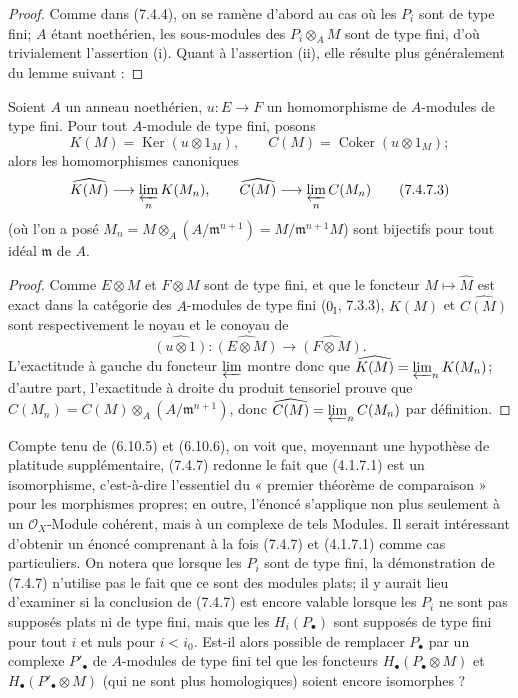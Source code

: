 \begin{proof}
Comme dans (7.4.4), on se ramène d'abord au cas où les $P_i$ sont de type fini;
$A$ étant noethérien, les sous-modules des $P_i\otimes_A M$ sont de type fini,
d'où trivialement l'assertion (i). Quant à l'assertion (ii), elle résulte plus
généralement du lemme suivant :
\end{proof}

\begin{lemma}[7.4.7.2]
Soient $A$ un anneau noethérien, $u:E\to F$ un homomorphisme de $A$-modules de
type fini. Pour tout $A$-module de type fini, posons
\[
  K(M)=\operatorname{Ker}(u\otimes1_M),
  \qquad
  C(M)=\operatorname{Coker}(u\otimes1_M);
\]
alors les homomorphismes canoniques
\[
  \widehat{K(M)}\longrightarrow\varprojlim_n K(M_n),
  \qquad
  \widehat{C(M)}\longrightarrow\varprojlim_n C(M_n)
  \tag{7.4.7.3}\label{III.7.4.7.3.fr}
\]
(où l'on a posé
$M_n=M\otimes_A(A/\mathfrak m^{n+1})=M/\mathfrak m^{n+1}M$) sont bijectifs
pour tout idéal $\mathfrak m$ de $A$.
\end{lemma}

\begin{proof}
Comme $E\otimes M$ et $F\otimes M$ sont de type fini, et que le foncteur
$M\mapsto\widehat M$ est exact dans la catégorie des $A$-modules de type fini
($0_{\mathrm I}$, 7.3.3), $\widehat{K(M)}$ et $\widehat{C(M)}$ sont
respectivement le noyau et le conoyau de
\[
  \widehat{(u\otimes1)}:
  \widehat{(E\otimes M)}\longrightarrow\widehat{(F\otimes M)}.
\]
L'exactitude à gauche du foncteur $\varprojlim$ montre donc que
$\widehat{K(M)}=\varprojlim_n K(M_n)$; d'autre part, l'exactitude à droite du
produit tensoriel prouve que
$C(M_n)=C(M)\otimes_A(A/\mathfrak m^{n+1})$, donc
$\widehat{C(M)}=\varprojlim_n C(M_n)$ par définition.
\end{proof}

\begin{remark}[7.4.8]
Compte tenu de (6.10.5) et (6.10.6), on voit que, moyennant une hypothèse de
platitude supplémentaire, (7.4.7) redonne le fait que (4.1.7.1) est un
isomorphisme, c'est-à-dire l'essentiel du « premier théorème de comparaison »
pour les morphismes propres; en outre, l'énoncé s'applique non plus seulement
à un $\mathscr O_X$-Module cohérent, mais à un complexe de tels Modules. Il
serait intéressant d'obtenir un énoncé comprenant à la fois (7.4.7) et
(4.1.7.1) comme cas particuliers. On notera que lorsque les $P_i$ sont de type
fini, la démonstration de (7.4.7) n'utilise pas le fait que ce sont des modules
plats; il y aurait lieu d'examiner si la conclusion de (7.4.7) est encore
valable lorsque les $P_i$ ne sont pas supposés plats ni de type fini, mais que
les $H_i(P_\bullet)$ sont supposés de type fini pour tout $i$ et nuls pour
$i<i_0$. Est-il alors possible de remplacer $P_\bullet$ par un complexe
$P'_\bullet$ de $A$-modules de type fini tel que les foncteurs
$H_\bullet(P_\bullet\otimes M)$ et $H_\bullet(P'_\bullet\otimes M)$ (qui ne
sont plus homologiques) soient encore isomorphes ?
\end{remark}

